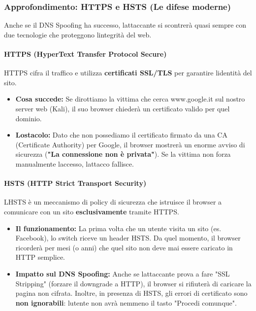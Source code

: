 \documentclass[11pt,a4paper]{article}
\begin{document}
\subsubsection{Approfondimento: HTTPS e HSTS (Le difese
moderne)}\label{approfondimento-https-e-hsts-le-difese-moderne}

Anche se il DNS Spoofing ha successo, l\textquotesingle attaccante si
scontrerà quasi sempre con due tecnologie che proteggono
l\textquotesingle integrità del web.

\paragraph{\texorpdfstring{\textbf{HTTPS (HyperText Transfer Protocol
Secure)}}{HTTPS (HyperText Transfer Protocol Secure)}}\label{https-hypertext-transfer-protocol-secure}

HTTPS cifra il traffico e utilizza \textbf{certificati SSL/TLS} per
garantire l\textquotesingle identità del sito.

\begin{itemize}
\item
  \textbf{Cosa succede:} Se dirottiamo la vittima che cerca
  www.google.it sul nostro server web (Kali), il suo browser chiederà un
  certificato valido per quel dominio.
\item
  \textbf{L\textquotesingle ostacolo:} Dato che non possediamo il
  certificato firmato da una CA (Certificate Authority) per Google, il
  browser mostrerà un enorme avviso di sicurezza (\textbf{"La
  connessione non è privata"}). Se la vittima non forza manualmente
  l\textquotesingle accesso, l\textquotesingle attacco fallisce.
\end{itemize}

\paragraph{\texorpdfstring{\textbf{HSTS (HTTP Strict Transport
Security)}}{HSTS (HTTP Strict Transport Security)}}\label{hsts-http-strict-transport-security}

L\textquotesingle HSTS è un meccanismo di policy di sicurezza che
istruisce il browser a comunicare con un sito \textbf{esclusivamente}
tramite HTTPS.

\begin{itemize}
\item
  \textbf{Il funzionamento:} La prima volta che un utente visita un sito
  (es. Facebook), lo switch riceve un header HSTS. Da quel momento, il
  browser ricorderà per mesi (o anni) che quel sito non deve mai essere
  caricato in HTTP semplice.
\item
  \textbf{Impatto sul DNS Spoofing:} Anche se
  l\textquotesingle attaccante prova a fare "SSL Stripping" (forzare il
  downgrade a HTTP), il browser si rifiuterà di caricare la pagina non
  cifrata. Inoltre, in presenza di HSTS, gli errori di certificato sono
  \textbf{non ignorabili}: l\textquotesingle utente non avrà nemmeno il
  tasto "Procedi comunque".
\end{itemize}
\end{document}
